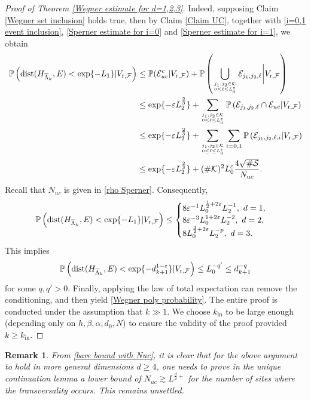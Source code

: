 \documentclass[11pt,reqno,UTF8,twoside]{amsart}
\newcommand{\barLambda}{\overline{\Lambda}}
\renewcommand{\P}{\mathbb{P}}
\newcommand{\mcE}{\mathcal{E}}
\newcommand{\mcF}{\mathcal{F}}
\newcommand{\mcS}{\mathcal{S}}
\newcommand{\mcK}{\mathcal{K}}
\newcommand{\dist}{{\rm dist}}
\newtheorem{rmk}{\bf Remark}[section]
\theoremstyle{definition}
\numberwithin{equation}{section}
\begin{document}
\begin{proof}[Proof of Theorem \ref{Wegner estimate for d=1,2,3}]
Indeed, supposing Claim \ref{Wegner set inclusion} holds true, then by Claim \ref{Claim UC}, together with \eqref{i=0,1 event inclusion}, \eqref{Sperner estimate for i=0} and \eqref{Sperner estimate for i=1}, we obtain
\begin{align}\label{bare bound with Nuc}
\notag  \P \left(\dist(H_{\barLambda_k},E)< \exp\{-L_1\} | V_{\text{r},\mcF} \right) & \leq \P(\mcE_{uc}^c| V_{\text{r},\mcF} ) +\P\left(\bigcup_{j_1,j_2\in \mcK \atop 0\leq \ell \leq L_0^{\varepsilon} }\mcE_{j_1,j_2,\ell} \bigg| V_{\text{r},\mcF} \right) \\
  \notag      & \leq \exp\{-\varepsilon L_2^{\frac{2}{3}}\} + \sum_{j_1,j_2\in \mcK \atop 0\leq \ell \leq L_0^{\varepsilon}} \P\left(\mcE_{j_1,j_2,\ell} \cap \mcE_{uc} | V_{\text{r},\mcF} \right) \\
    \notag    &\leq  \exp\{-\varepsilon L_2^{\frac{2}{3}}\} + \sum_{j_1,j_2\in \mcK \atop 0\leq \ell \leq L_0^{\varepsilon}} \sum_{i=0,1} \P\left(\mcE_{j_1,j_2,\ell,i} | V_{\text{r},\mcF} \right) \\
      & \leq \exp\{-\varepsilon L_2^{\frac{2}{3}}\} + (\#\mcK)^2 L_0^{\varepsilon} \frac{4\sqrt{\# \mcS}}{N_{uc}}.
\end{align}
Recall that $N_{uc}$ is given in  \eqref{rho Sperner}. Consequently,
\begin{equation*}
    \P \left(\dist(H_{\barLambda_k},E)< \exp\{-L_1\} | V_{\text{r},\mcF} \right)  \leq 
    \begin{cases}
      8\varepsilon^{-1}L_0^{\frac{1}{2}+2\varepsilon}L_2^{-1}, \ d=1, \\
        8\varepsilon^{-3}L_0^{1+2\varepsilon}L_2^{-2}, \ d=2,\\
      8 L_0^{\frac{3}{2}+2\varepsilon}L_2^{-p} , \ d=3.
    \end{cases}
\end{equation*}
This implies
\[\P \left(\dist(H_{\barLambda_k},E)<\exp\{-d_{k+1}^{1-\varepsilon}\} | V_{\text{r},\mcF} \right) \leq L_0^{-q'} \leq d_{k+1}^{-q} \]
for some   $q,q'>0$. Finally, applying the law of total expectation  can  remove the conditioning, and then  yield  \eqref{Wegner poly probability}. The entire proof is conducted under the assumption that $k\gg1$. We choose $k_{\text{in}}$ to be large enough (depending  only on $h,\beta,\alpha,d_0,N$) to ensure the validity of the proof provided  $k\geq k_{\text{in}}$.




\end{proof}

\begin{rmk}
From \eqref{bare bound with Nuc}, it is clear that for the above argument to hold in more general dimensions $d\geq 4$, one  needs to prove in the unique continuation lemma a lower bound of   $N_{uc}\gtrsim L^{\frac{d}{2}+}$ for the number of sites where the  transversality occurs. This remains unsettled. 
\end{rmk}
\end{document}
